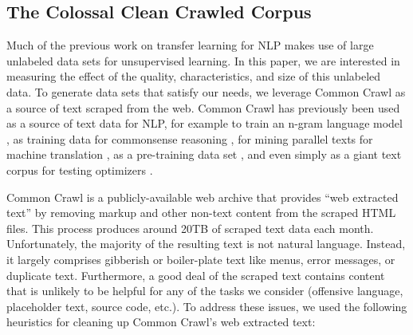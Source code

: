 \subsection{The Colossal Clean Crawled Corpus}
\label{sec:dataset}

Much of the previous work on transfer learning for NLP makes use of large unlabeled data sets for unsupervised learning. In this paper, we are interested in measuring the effect of the quality, characteristics, and size of this unlabeled data. To generate data sets that satisfy our needs, we leverage Common Crawl as a source of text scraped from the web. Common Crawl has previously been used as a source of text data for NLP, for example to train an n-gram language model \citep{buck2014n}, as training data for commonsense reasoning \citep{trinh2018simple}, for mining parallel texts for machine translation \citep{smith2013dirt}, as a pre-training data set \citep{grave2018learning,zellers2019defending,liu2019roberta}, and even simply as a giant text corpus for testing optimizers \citep{anil2019memory}.

Common Crawl is a publicly-available web archive that provides ``web extracted text'' by removing markup and other non-text content from the scraped HTML files. This process produces around 20TB of scraped text data each month. Unfortunately, the majority of the resulting text is not natural language. Instead, it largely comprises gibberish or boiler-plate text like menus, error messages, or duplicate text. Furthermore, a good deal of the scraped text contains content that is unlikely to be helpful for any of the tasks we consider (offensive language, placeholder text, source code, etc.). To address these issues, we used the following heuristics for cleaning up Common Crawl's web extracted text:

